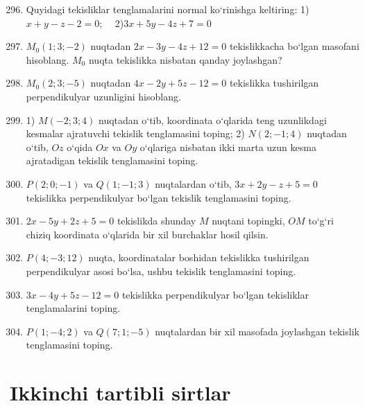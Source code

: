 \begin{enumerate}\setcounter{enumi}{295}
	\item Quyidagi tekisliklar tenglamalarini normal ko`rinishga keltiring:
	1)$x+y-z-2=0$; \ \ 2)$3x+5y-4z+7=0$
	\item $M_0(1;3;-2)$ nuqtadan $2x-3y-4z+12=0$ tekislikkacha bo`lgan masofani hisoblang. $M_0$ nuqta tekislikka nisbatan qanday joylashgan?
	\item $M_0(2;3;-5)$ nuqtadan $4x-2y+5z-12=0$ tekislikka tushirilgan perpendikulyar uzunligini hisoblang.
	\item 1) $M(-2;3;4)$ nuqtadan o`tib, koordinata o`qlarida teng uzunlikdagi kesmalar ajratuvchi tekislik tenglamasini toping;
	2) $N(2;-1;4)$ nuqtadan o`tib, $Oz$ o`qida $Ox$ va $Oy$ o`qlariga nisbatan ikki marta uzun kesma ajratadigan tekislik tenglamasini toping.
	\item $P(2;0;-1)$ va $Q(1;-1;3)$ nuqtalardan o`tib, $3x+2y-z+5=0$ tekislikka perpendikulyar bo`lgan tekislik tenglamasini toping. 
	\item $2x-5y+2z+5=0$ tekislikda shunday $M$ nuqtani topingki, $OM$ to`g`ri chiziq koordinata o`qlarida bir xil burchaklar hosil qilsin.
	\item $P(4;-3;12)$ nuqta, koordinatalar boshidan tekislikka tushirilgan perpendikulyar asosi bo`lsa, ushbu tekislik tenglamasini toping.
	\item $3x-4y+5z-12=0$ tekislikka perpendikulyar bo`lgan tekisliklar tenglamalarini toping.
	\item $P(1;-4;2)$ va $Q(7;1;-5)$ nuqtalardan bir xil masofada joylashgan tekislik tenglamasini toping.
	

	
	
\end{enumerate}
\section{Ikkinchi tartibli sirtlar}
